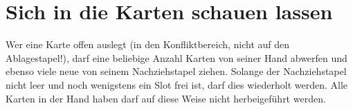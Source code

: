 \section{Sich in die Karten schauen lassen}
Wer eine Karte offen auslegt (in den Konfliktbereich, nicht auf den Ablagestapel!), darf eine beliebige Anzahl Karten von seiner Hand abwerfen und ebenso viele neue von seinem Nachziehstapel ziehen. Solange der Nachziehstapel nicht leer und noch wenigstens ein Slot frei ist, darf dies wiederholt werden. Alle Karten in der Hand haben darf auf diese Weise nicht herbeigeführt werden.

